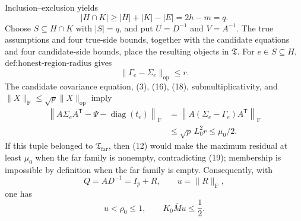 Inclusion--exclusion yields
\[
|H\cap K|\geq|H|+|K|-|E|=2h-m=q.
\tag{17}
\]
Choose \(S\subseteq H\cap K\) with \(|S|=q\), and put \(U=D^{-1}\) and \(V=A^{-1}\). The true assumptions and four true-side bounds, together with the candidate equations and four candidate-side bounds, place the resulting objects in \(\mathfrak T\). For \(e\in S\subseteq H\), \(\text{def:honest-region-radius}\) gives
\[
\|\Gamma_e-\Sigma_e\|_{\mathrm{op}}\leq r.
\tag{18}
\]
The candidate covariance equation, (3), (16), (18), submultiplicativity, and \(\|X\|_{\mathrm F}\leq\sqrt p\|X\|_{\mathrm{op}}\) imply
\[
\begin{aligned}
\left\|A\Sigma_eA^{\mathsf T}
-\Psi-\operatorname{diag}(t_e)\right\|_{\mathrm F}
&=\left\|A(\Sigma_e-\Gamma_e)A^{\mathsf T}\right\|_{\mathrm F}\\
&\leq\sqrt p\,L_0^2r
\leq\mu_0/2.
\end{aligned}
\tag{19}
\]
If this tuple belonged to \(\mathfrak T_{\mathrm{far}}\), then (12) would make the maximum residual at least \(\mu_0\) when the far family is nonempty, contradicting (19); membership is impossible by definition when the far family is empty. Consequently, with
\[
Q=AD^{-1}=I_p+R,
\qquad
u=\|R\|_{\mathrm F},
\]
one has
\[
u<\rho_0\leq1,
\qquad
K_0\overline M u\leq\frac12.
\tag{20}
\]

